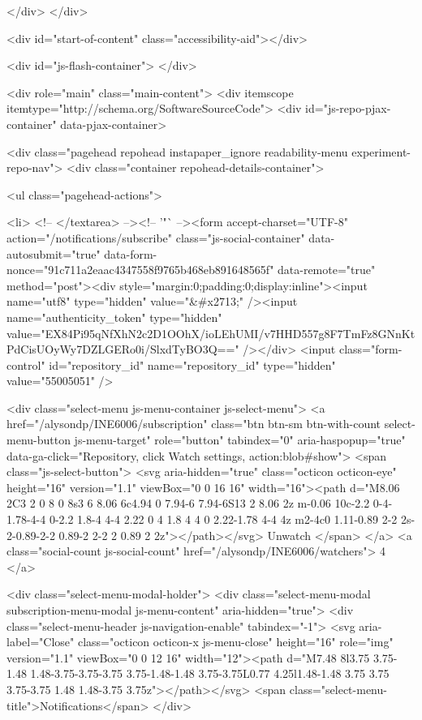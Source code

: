     
  </div>
</div>


      


    <div id="start-of-content" class="accessibility-aid"></div>

      <div id="js-flash-container">
</div>


    <div role="main" class="main-content">
        <div itemscope itemtype="http://schema.org/SoftwareSourceCode">
    <div id="js-repo-pjax-container" data-pjax-container>
      
<div class="pagehead repohead instapaper_ignore readability-menu experiment-repo-nav">
  <div class="container repohead-details-container">

    

<ul class="pagehead-actions">

  <li>
        <!-- </textarea> --><!-- '"` --><form accept-charset="UTF-8" action="/notifications/subscribe" class="js-social-container" data-autosubmit="true" data-form-nonce="91c711a2eaac4347558f9765b468eb891648565f" data-remote="true" method="post"><div style="margin:0;padding:0;display:inline"><input name="utf8" type="hidden" value="&#x2713;" /><input name="authenticity_token" type="hidden" value="EX84Pi95qNfXhN2c2D1OOhX/ioLEhUMI/v7HHD557g8F7TmFz8GNnKtPdCisUOyWy7DZLGERo0i/SlxdTyBO3Q==" /></div>      <input class="form-control" id="repository_id" name="repository_id" type="hidden" value="55005051" />

        <div class="select-menu js-menu-container js-select-menu">
          <a href="/alysondp/INE6006/subscription"
            class="btn btn-sm btn-with-count select-menu-button js-menu-target" role="button" tabindex="0" aria-haspopup="true"
            data-ga-click="Repository, click Watch settings, action:blob#show">
            <span class="js-select-button">
              <svg aria-hidden="true" class="octicon octicon-eye" height="16" version="1.1" viewBox="0 0 16 16" width="16"><path d="M8.06 2C3 2 0 8 0 8s3 6 8.06 6c4.94 0 7.94-6 7.94-6S13 2 8.06 2z m-0.06 10c-2.2 0-4-1.78-4-4 0-2.2 1.8-4 4-4 2.22 0 4 1.8 4 4 0 2.22-1.78 4-4 4z m2-4c0 1.11-0.89 2-2 2s-2-0.89-2-2 0.89-2 2-2 2 0.89 2 2z"></path></svg>
              Unwatch
            </span>
          </a>
          <a class="social-count js-social-count" href="/alysondp/INE6006/watchers">
            4
          </a>

        <div class="select-menu-modal-holder">
          <div class="select-menu-modal subscription-menu-modal js-menu-content" aria-hidden="true">
            <div class="select-menu-header js-navigation-enable" tabindex="-1">
              <svg aria-label="Close" class="octicon octicon-x js-menu-close" height="16" role="img" version="1.1" viewBox="0 0 12 16" width="12"><path d="M7.48 8l3.75 3.75-1.48 1.48-3.75-3.75-3.75 3.75-1.48-1.48 3.75-3.75L0.77 4.25l1.48-1.48 3.75 3.75 3.75-3.75 1.48 1.48-3.75 3.75z"></path></svg>
              <span class="select-menu-title">Notifications</span>
            </div>

